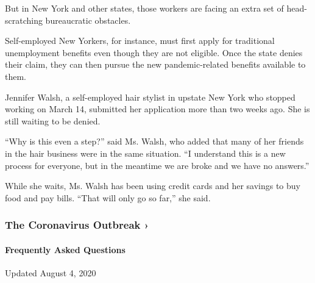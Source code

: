 But in New York and other states, those workers are facing an extra set
of head-scratching bureaucratic obstacles.

Self-employed New Yorkers, for instance, must first apply for
traditional unemployment benefits even though they are not eligible.
Once the state denies their claim, they can then pursue the new
pandemic-related benefits available to them.

Jennifer Walsh, a self-employed hair stylist in upstate New York who
stopped working on March 14, submitted her application more than two
weeks ago. She is still waiting to be denied.

``Why is this even a step?'' said Ms. Walsh, who added that many of her
friends in the hair business were in the same situation. ``I understand
this is a new process for everyone, but in the meantime we are broke and
we have no answers.''

While she waits, Ms. Walsh has been using credit cards and her savings
to buy food and pay bills. ``That will only go so far,'' she said.

\href{https://www.nytimes.com/news-event/coronavirus?action=click\&pgtype=Article\&state=default\&region=MAIN_CONTENT_3\&context=storylines_faq}{}

\hypertarget{the-coronavirus-outbreak-}{%
\subsubsection{The Coronavirus Outbreak
›}\label{the-coronavirus-outbreak-}}

\hypertarget{frequently-asked-questions}{%
\paragraph{Frequently Asked
Questions}\label{frequently-asked-questions}}

Updated August 4, 2020

